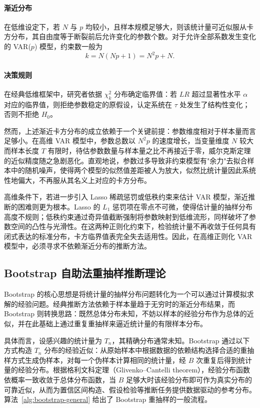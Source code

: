 \paragraph{渐近分布}在低维设定下，若 $N$ 与 $p$ 均较小，且样本规模足够大，则该统计量可近似服从卡方分布，其自由度等于断裂前后允许变化的参数个数。对于允许全部系数发生变化的 VAR($p$) 模型，约束数一般为
\begin{equation}
k = N(Np+1)=N^2p+N.
\end{equation}

\paragraph{决策规则}在经典低维框架中，研究者依据 $\chi_k^2$ 分布确定临界值：若 $LR$ 超过显著性水平 $\alpha$ 对应的临界值，则拒绝参数稳定的原假设，认定系统在 $\tau$ 处发生了结构性变化；否则不拒绝 $H_0$。

然而，上述渐近卡方分布的成立依赖于一个关键前提：参数维度相对于样本量而言足够小。在高维 VAR 模型中，参数总数以 $N^2p$ 的速度增长，当变量维度 $N$ 较大而样本长度 $T$ 有限时，待估参数数量与样本量之比不再接近于零，威尔克斯定理的近似精度随之急剧恶化。直观地说，参数过多导致非约束模型有"余力"去拟合样本中的随机噪声，使得两个模型的似然值差距被人为放大，似然比统计量因此系统性地偏大，不再服从其名义上对应的卡方分布。

高维条件下，若进一步引入 Lasso 稀疏惩罚或低秩约束来估计 VAR 模型，渐近推断的困难则更为根本。Lasso 的 $L_1$ 惩罚项在零点不可微，使得估计量的抽样分布高度不规则；低秩约束通过奇异值截断强制将参数映射到低维流形，同样破坏了参数空间的凸性与光滑性。在这两种正则化约束下，检验统计量不再收敛于任何具有闭式表达的标准分布，卡方临界值表完全失去适用性。因此，在高维正则化 VAR 模型中，必须寻求不依赖渐近分布的推断方法。

\subsection{Bootstrap 自助法重抽样推断理论}

Bootstrap 的核心思想是将统计量的抽样分布问题转化为一个可以通过计算模拟求解的经验问题。经典推断方法依赖于样本量趋于无穷时的渐近分布结果，而 Bootstrap 则转换思路：既然总体分布未知，不妨以样本的经验分布作为总体的近似，并在此基础上通过重复重抽样来逼近统计量的有限样本分布。

具体而言，设感兴趣的统计量为 $T_n$，其精确分布通常未知。Bootstrap 通过以下方式构造 $T_n$ 分布的经验近似：从原始样本中根据数据的依赖结构选择合适的重抽样方式生成伪样本，对每一个伪样本计算相同的统计量，经 $B$ 次重复后得到统计量的经验分布。根据格利文科定理（Glivenko--Cantelli theorem），经验分布函数依概率一致收敛于总体分布函数，当 $B$ 足够大时该经验分布即可作为真实分布的可靠近似，从而为置信区间构造、假设检验等推断任务提供数据驱动的参考分布。算法~\ref{alg:bootstrap-general} 给出了 Bootstrap 重抽样的一般流程。

